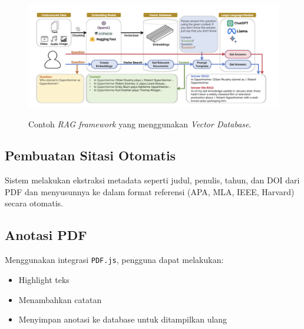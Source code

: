 \begin{figure}[htbp]
  \centering
  \includegraphics[width=0.85\linewidth]{images/bab-3/embeddings.png}
  \caption{Contoh \emph{RAG framework} yang menggunakan \emph{Vector Database}.}\label{fig:RAG-Framework}\citep{Jing}
\end{figure}

\subsection{Pembuatan Sitasi Otomatis}
Sistem melakukan ekstraksi metadata seperti judul, penulis, tahun, dan DOI dari PDF dan menyusunnya ke dalam format referensi (APA, MLA, IEEE, Harvard) secara otomatis.

\subsection{Anotasi PDF}
Menggunakan integrasi \texttt{PDF.js}, pengguna dapat melakukan:
\begin{itemize}
  \item Highlight teks
  \item Menambahkan catatan
  \item Menyimpan anotasi ke database untuk ditampilkan ulang
\end{itemize}